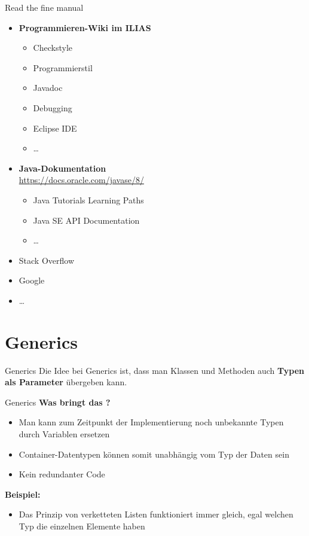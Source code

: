 \documentclass[18pt]{beamer}
\begin{document}
\begin{frame}{Read the fine manual}
    \begin{itemize}
        \item \textbf{Programmieren-Wiki im ILIAS}
        \begin{itemize}
            \item \alert{Checkstyle}
            \item Programmierstil
            \item Javadoc
            \item Debugging
            \item Eclipse IDE
            \item \dots
        \end{itemize}

        \item \textbf{Java-Dokumentation}\\
        \url{https://docs.oracle.com/javase/8/}
        \begin{itemize}
            \item Java Tutorials Learning Paths
            \item Java SE API Documentation
            \item \dots
        \end{itemize}

        \item Stack Overflow
        \item Google
        \item \dots

    \end{itemize}
\end{frame}

\section{Generics}

\begin{frame}{Generics}
    Die Idee bei Generics ist, dass man Klassen und Methoden auch \textbf{Typen als Parameter} übergeben kann.
\end{frame}

\begin{frame}{Generics}
    \textbf{Was bringt das ?}
    \begin{itemize}
        \item Man kann zum Zeitpunkt der Implementierung noch unbekannte Typen durch Variablen ersetzen
        \item Container-Datentypen können somit unabhängig vom Typ der Daten sein
        \item Kein redundanter Code
    \end{itemize}
    \vspace{.2in}
    \textbf{Beispiel:}
    \begin{itemize}
        \item Das Prinzip von verketteten Listen funktioniert immer gleich, egal welchen Typ die einzelnen Elemente haben
    \end{itemize}
\end{frame}
\end{document}
